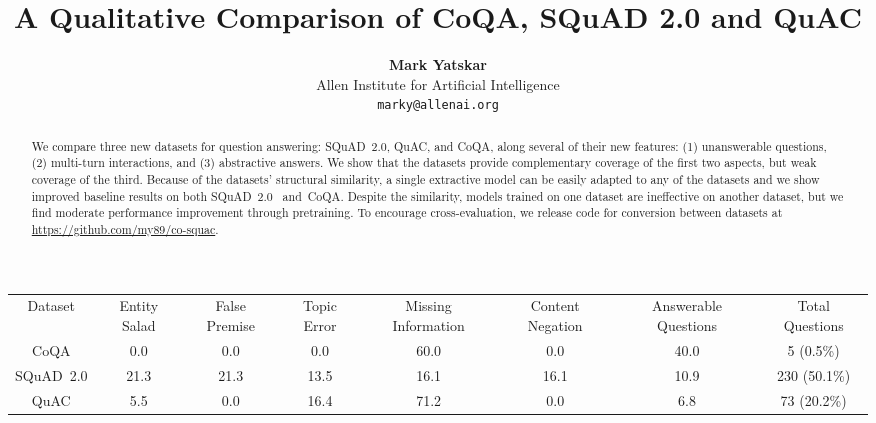\documentclass[11pt,a4paper]{article}
\title{A Qualitative Comparison of CoQA, SQuAD 2.0 and \quac QuAC}
\author{
\textbf{Mark Yatskar} \vspace{2mm} \\Allen Institute for Artificial Intelligence\\ \texttt{marky@allenai.org}
}
\newcommand{\quact}[0]{QuAC}
\newcommand{\coqa}[0]{CoQA}
\newcommand{\squad}[0]{SQuAD~2.0}
\begin{document}
\maketitle
\begin{abstract}
We compare three new datasets for question answering: \squad, \quact, and \coqa, along several of their new features: (1) unanswerable questions, (2) multi-turn interactions, and (3) abstractive answers.
We show that the datasets provide complementary coverage of the first two aspects, but weak coverage of the third.
Because of the datasets' structural similarity, a single extractive model can be easily adapted to any of the datasets and we show improved baseline results on both \squad~ and~\coqa.
Despite the similarity, models trained on one dataset are ineffective on another dataset, but we find moderate performance improvement through pretraining.
To encourage cross-evaluation, we release code for conversion between datasets at \href{https://github.com/my89/co-squac}{https://github.com/my89/co-squac}.
\end{abstract} \begin{table*}[th]
 \small
 \centering
\begin{tabular}
{c|c|c|c|c|c|c|c}

\multirow{2}{*}{Dataset}& \multirow{2}{*}{\parbox{1cm}{\centering Entity Salad}} &\multirow{2}{*}{\parbox{1cm}{\centering False Premise}} & \multirow{2}{*}{\parbox{1.2cm}{\centering Topic Error}} &
\multirow{2}{*}{\parbox{1.8 cm}{\centering Missing Information}}  & \multirow{2}{*}{\parbox{1.7cm}{\centering Content Negation}} &   
\multirow{2}{*}{\parbox{1.7cm}{\centering Answerable Questions}} &   
\multirow{2}{*}{\parbox{1.7cm}{\centering Total Questions}} 
\\
&&&&&\\\midrule
\coqa & 0.0 & 0.0  &  0.0 &  60.0 & 0.0 & 40.0 & 5 (0.5\%)\\
\squad & 21.3 & 21.3 & 13.5 & 16.1 & 16.1 & 10.9 & 230 (50.1\%) \\
\quact & 5.5 & 0.0 & 16.4 & 71.2 & 0.0 & 6.8 & 73 (20.2\%)\\ 
 
\end{tabular}
\vspace{-7pt}
\caption{Comparison of unanswerable questions on 50 random contexts from the development set of each dataset. \squad~contains a diverse set of circumstances that make questions unanswerable, \quact~focuses on information that could plausibly be in context material and \coqa~does not significantly cover unanswerable questions.} 
 \label{tab:unanswerable}
\vspace{-7pt}
\end{table*}
\end{document}
